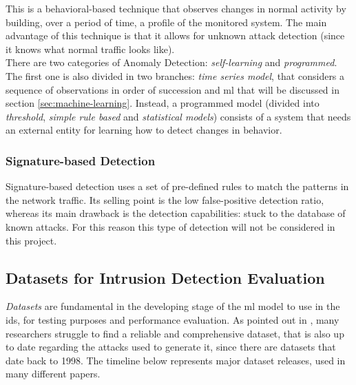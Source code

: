 This is a behavioral-based technique that observes changes in normal activity by building, over a period of time, a profile of the monitored system. The main advantage of this technique is that it allows for unknown attack detection (since it knows what normal traffic looks like). \\ There are two categories of Anomaly Detection: \textit{self-learning} and \textit{programmed}. The first one is also divided in two branches: \textit{time series model}, that considers a sequence of observations in order of succession and \gls{ml} that will be discussed in section \ref{sec:machine-learning}. Instead, a programmed model (divided into \textit{threshold}, \textit{simple rule based} and \textit{statistical models}) consists of a system that needs an external entity for learning how to detect changes in behavior.


\subsubsection{Signature-based Detection}
\label{subsubsec:signature-detection}

Signature-based detection uses a set of pre-defined rules to match the patterns in the network traffic. Its selling point is the low false-positive detection ratio, whereas its main drawback is the detection capabilities: stuck to the database of known attacks. For this reason this type of detection will not be considered in this project.


\subsection{Datasets for Intrusion Detection Evaluation}
\label{subsec:datasets-for-evaluation}


\textit{Datasets} are fundamental in the developing stage of the \gls{ml} model to use in the \gls{ids}, for testing purposes and performance evaluation. As pointed out in \cite{icissp18}, many researchers struggle to find a reliable and comprehensive dataset, that is also up to date regarding the attacks used to generate it, since there are datasets that date back to 1998. The timeline below represents major dataset releases, used in many different papers.

